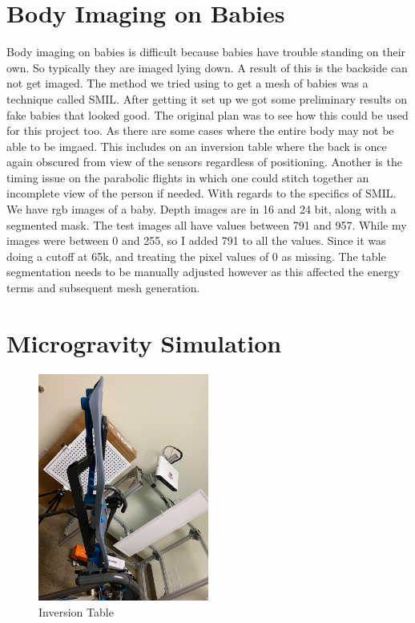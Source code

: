 \section{Body Imaging on Babies}
Body imaging on babies is difficult because babies have trouble standing on their own. So typically they are imaged lying down. A result of this is the backside can not get imaged. The method we tried using to get a mesh of babies was a technique called SMIL\cite{hesse2018learning}. After getting it set up we got some preliminary results on fake babies that looked good. The original plan was to see how this could be used for this project too. As there are some cases where the entire body may not be able to be imgaed. This includes on an inversion table where the back is once again obscured from view of the sensors regardless of positioning. Another is the timing issue on the parabolic flights in which one could stitch together an incomplete view of the person if needed. With regards to the specifics of SMIL. We have rgb images of a baby. Depth images are in 16 and 24 bit, along with a segmented mask. The test images all have values between 791 and 957. While my images were between 0 and 255, so I added 791 to all the values. Since it was doing a cutoff at 65k, and treating the pixel values of 0 as missing. The table segmentation needs to be manually adjusted however as this affected the energy terms and subsequent mesh generation.
\section{Microgravity Simulation}


\begin{figure}[!htb]
	\caption{Inversion Table}
	\centering
	\includegraphics[width=0.5\textwidth]{images/inversion.jpg}
\end{figure}
